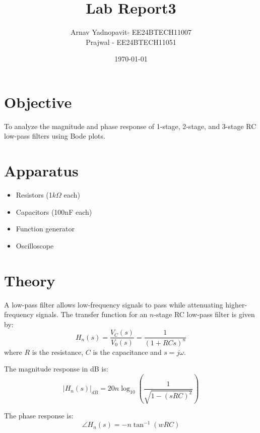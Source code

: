 \documentclass[a4paper,12pt]{article}
\title{Lab Report3}
\author{Arnav Yadnopavit- EE24BTECH11007\\Prajwal - EE24BTECH11051}
\date{\today}
\begin{document}
\maketitle
\section*{Objective}
To analyze the magnitude and phase response of 1-stage, 2-stage, and 3-stage RC low-pass filters using Bode plots.

\section*{Apparatus}
\begin{itemize}
    \item Resistors (1$k\Omega$ each)
    \item Capacitors (100nF each)
    \item Function generator
    \item Oscilloscope
\end{itemize}

\section*{Theory}
A low-pass filter allows low-frequency signals to pass while attenuating higher-frequency signals. The transfer function for an $n$-stage RC low-pass filter is given by:
\begin{equation}
H_n(s) =\frac{V_C(s)}{V_0(s)}= \frac{1}{(1 + RCs)^n}
\end{equation}
where $R$ is the resistance, $C$ is the capacitance and $s=j\omega$.

The magnitude response in dB is:
\begin{equation}
|H_n(s)|_{dB} = 20n \log_{10}\left(\frac{1}{\sqrt{1-(sRC)^2}}\right)
\end{equation}

The phase response is:
\begin{equation}
\angle H_n(s) = -n \tan^{-1}(w RC)
\end{equation}
\begin{figure}[H]
    \centering
    \begin{subfigure}{0.5\textwidth}
        
    \end{subfigure}%
    \begin{subfigure}{0.5\textwidth}
        \centering
        
    \end{subfigure}
    \begin{subfigure}{0.5\textwidth}
        \centering
        
    \end{subfigure}
\end{figure}
\end{document}
